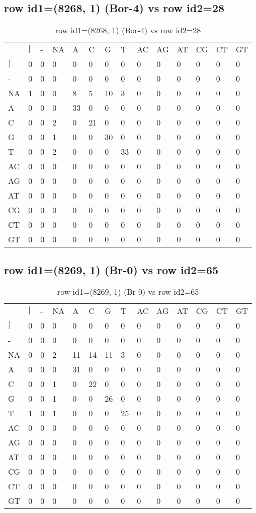 \subsection{row id1=(8268, 1) (Bor-4) vs row id2=28}
\begin{center}
\begin{longtable}{|l|l|l|l|l|l|l|l|l|l|l|l|l|l|}
\caption{row id1=(8268, 1) (Bor-4) vs row id2=28} \label{table_dm418}\\
\hline
\\
\hline
&$|$&-&NA&A&C&G&T&AC&AG&AT&CG&CT&GT\\
$|$&0&0&0&0&0&0&0&0&0&0&0&0&0\\
-&0&0&0&0&0&0&0&0&0&0&0&0&0\\
NA&1&0&0&8&5&10&3&0&0&0&0&0&0\\
A&0&0&0&33&0&0&0&0&0&0&0&0&0\\
C&0&0&2&0&21&0&0&0&0&0&0&0&0\\
G&0&0&1&0&0&30&0&0&0&0&0&0&0\\
T&0&0&2&0&0&0&33&0&0&0&0&0&0\\
AC&0&0&0&0&0&0&0&0&0&0&0&0&0\\
AG&0&0&0&0&0&0&0&0&0&0&0&0&0\\
AT&0&0&0&0&0&0&0&0&0&0&0&0&0\\
CG&0&0&0&0&0&0&0&0&0&0&0&0&0\\
CT&0&0&0&0&0&0&0&0&0&0&0&0&0\\
GT&0&0&0&0&0&0&0&0&0&0&0&0&0\\
\hline
\end{longtable}
\end{center}

\subsection{row id1=(8269, 1) (Br-0) vs row id2=65}
\begin{center}
\begin{longtable}{|l|l|l|l|l|l|l|l|l|l|l|l|l|l|}
\caption{row id1=(8269, 1) (Br-0) vs row id2=65} \label{table_dm420}\\
\hline
\\
\hline
&$|$&-&NA&A&C&G&T&AC&AG&AT&CG&CT&GT\\
$|$&0&0&0&0&0&0&0&0&0&0&0&0&0\\
-&0&0&0&0&0&0&0&0&0&0&0&0&0\\
NA&0&0&2&11&14&11&3&0&0&0&0&0&0\\
A&0&0&0&31&0&0&0&0&0&0&0&0&0\\
C&0&0&1&0&22&0&0&0&0&0&0&0&0\\
G&0&0&1&0&0&26&0&0&0&0&0&0&0\\
T&1&0&1&0&0&0&25&0&0&0&0&0&0\\
AC&0&0&0&0&0&0&0&0&0&0&0&0&0\\
AG&0&0&0&0&0&0&0&0&0&0&0&0&0\\
AT&0&0&0&0&0&0&0&0&0&0&0&0&0\\
CG&0&0&0&0&0&0&0&0&0&0&0&0&0\\
CT&0&0&0&0&0&0&0&0&0&0&0&0&0\\
GT&0&0&0&0&0&0&0&0&0&0&0&0&0\\
\hline
\end{longtable}
\end{center}

